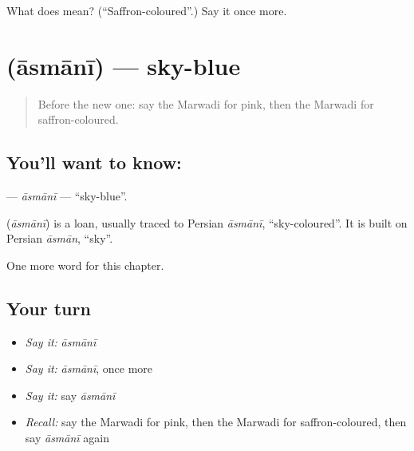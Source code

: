 \begin{tcolorbox}[breakable,colback=teal!4,colframe=teal!35!black,title={Before you move on}]
What does  mean? (\textquotedblleft{}Saffron-coloured\textquotedblright{}.) Say it once more.
\end{tcolorbox}
\section[\texorpdfstring{\mw{आसमानी} (āsmānī)}{आसमानी (āsmānī)}]{ (āsmānī) — sky-blue}

\label{lesson:MW-C145-asmani}



\begin{quote}
Before the new one: say the Marwadi for pink, then the Marwadi for saffron-coloured.
\end{quote}

\subsection*{You'll want to know: }
\textbf{} — \emph{āsmānī} — \textquotedblleft{}sky-blue\textquotedblright{}.

\begin{cousinweb}
\textbf{} (\emph{āsmānī}) is a loan, usually traced to Persian \emph{āsmānī}, \textquotedblleft{}sky-coloured\textquotedblright{}. It is built on Persian \emph{āsmān}, \textquotedblleft{}sky\textquotedblright{}.
\end{cousinweb}

\begin{grammarlens}[title={What you've built}]
One more word for this chapter.
\end{grammarlens}

\subsection*{Your turn}
\begin{itemize}
\raggedright
  \item \emph{Say it:} \emph{āsmānī}
  \item \emph{Say it:} \emph{āsmānī}, once more
  \item \emph{Say it:} say \emph{āsmānī}
  \item \emph{Recall:} say the Marwadi for pink, then the Marwadi for saffron-coloured, then say \emph{āsmānī} again
\end{itemize}

